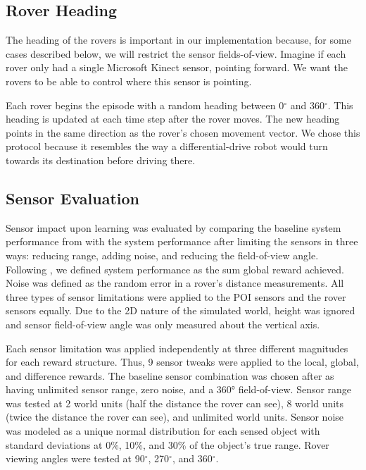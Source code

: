 \documentclass[letterpaper, 10 pt, conference]{ieeeconf}  %
\begin{document}
\subsection{Rover Heading}
The heading of the rovers is important in our implementation because, for some cases described below, we will restrict the sensor fields-of-view. Imagine if each rover only had a single Microsoft Kinect sensor, pointing forward. We want the rovers to be able to control where this sensor is pointing. 

Each rover begins the episode with a random heading between 0$^{\circ}$ and 360$^{\circ}$. This heading is updated at each time step after the rover moves. The new heading points in the same direction as the rover's chosen movement vector. We chose this protocol because it resembles the way a differential-drive robot would turn towards its destination before driving there. 

\subsection{Sensor Evaluation}
Sensor impact upon learning was evaluated by comparing the baseline
system performance from \cite{agogino2008analyzing} with the system performance after limiting
the sensors in three ways: reducing range, adding noise, and reducing
the field-of-view angle.  Following \cite{agogino2008analyzing}, we defined system performance
as the sum global reward achieved.  Noise was defined as the random
error in a rover’s distance measurements. All three types of sensor
limitations were applied to the POI sensors and the rover sensors
equally. Due to the 2D nature of the simulated world, height was
ignored and sensor field-of-view angle was only measured about the
vertical axis.

Each sensor limitation was applied independently at three different
magnitudes for each reward structure.  Thus, 9 sensor tweaks were applied to
the local, global, and difference rewards. The baseline sensor combination was chosen after \cite{agogino2008analyzing} as having unlimited sensor range, zero noise, and a 360° field-of-view. Sensor
range was tested at 2 world units (half the distance the rover can see), 8 world units (twice the distance 
the rover can see), and unlimited world units. Sensor noise was modeled as a unique normal distribution for
each sensed object with standard deviations at 0\%, 10\%, and 30\% of the
object’s true range. Rover viewing angles were tested at 90$^{\circ}$, 270$^{\circ}$,
and 360$^{\circ}$.
\end{document}
